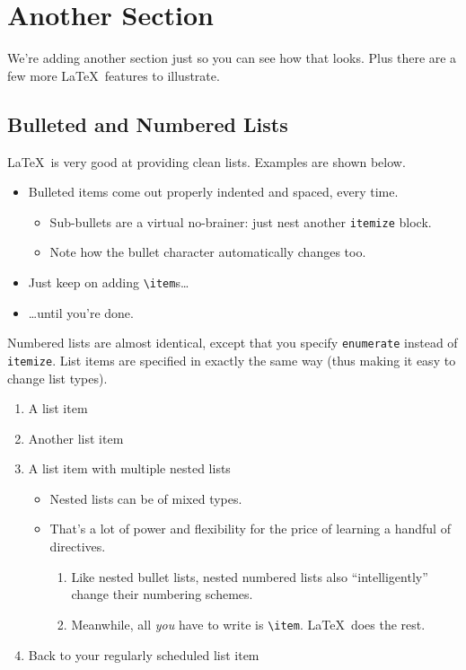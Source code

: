 \documentclass{article}
\begin{document}
\section{Another Section}

We're adding another section just so you can see how that looks.  Plus there are a few more \LaTeX\ features to illustrate.

\subsection{Bulleted and Numbered Lists}

\LaTeX\ is very good at providing clean lists.  Examples are shown below.

\begin{itemize}
\item Bulleted items come out properly indented and spaced, every time.

\begin{itemize}
\item Sub-bullets are a virtual no-brainer: just nest another \verb!itemize! block.
\item Note how the bullet character automatically changes too.
\end{itemize}

\item Just keep on adding \verb!\item!s\ldots

\item \ldots until you're done.
\end{itemize}

Numbered lists are almost identical, except that you specify \verb!enumerate! instead of \verb!itemize!.  List items are specified in exactly the same way (thus making it easy to change list types).

\begin{enumerate}
\item A list item
\item Another list item
\item A list item with multiple nested lists

\begin{itemize}
\item Nested lists can be of mixed types.
\item That's a lot of power and flexibility for the price of learning a handful of directives.

\begin{enumerate}
\item Like nested bullet lists, nested numbered lists also ``intelligently'' change their numbering schemes.
\item Meanwhile, all \emph{you} have to write is \verb!\item!.  \LaTeX\ does the rest.
\end{enumerate}
\end{itemize}

\item Back to your regularly scheduled list item

\end{enumerate}
\end{document}
